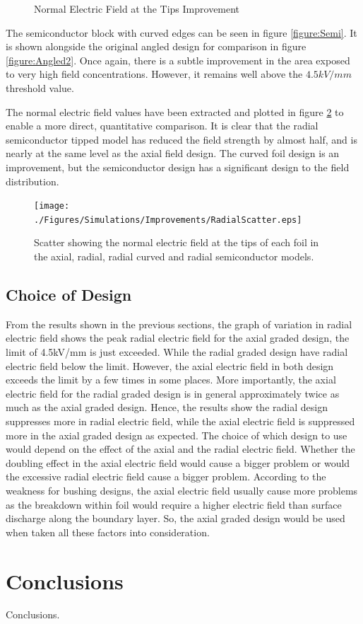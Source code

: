 \begin{figure}[!h]
\centering
{}
\caption{Normal Electric Field at the Tips Improvement}
\label{figure:semicompare}
\end{figure}

The semiconductor block with curved edges can be seen in figure \ref{figure:Semi}.
It is shown alongside the original angled design for comparison in figure \ref{figure:Angled2}.
Once again, there is a subtle improvement in the area exposed to very high field concentrations.
However, it remains well above the $4.5kV/mm$ threshold value.

The normal electric field values have been extracted and plotted in figure \ref{figure:scattercomp} to enable a more direct, quantitative comparison.
It is clear that the radial semiconductor tipped model has reduced the field strength by almost half, and is nearly at the same level as the axial field design.
The curved foil design is an improvement, but the semiconductor design has a significant design to the field distribution.

\begin{figure}[!h]
\centering
\texttt{[image: ./Figures/Simulations/Improvements/RadialScatter.eps]}
\caption{Scatter showing the normal electric field at the tips of each foil in the axial, radial, radial curved and radial semiconductor models.}
\label{figure:scattercomp}
\end{figure}


\subsection{Choice of Design}
From the results shown in the previous sections, the graph of variation in radial electric field shows the peak radial electric field for the axial graded design, the limit of 4.5kV/mm is just exceeded. While the radial graded design have radial electric field below the limit. However, the axial electric field in both design exceeds the limit by a few times in some places. More importantly, the axial electric field for the radial graded design is in general approximately twice as much as the axial graded design. Hence, the results show the radial design suppresses more in radial electric field, while the axial electric field is suppressed more in the axial graded design as expected. The choice of which design to use would depend on the effect of the axial and the radial electric field. Whether the doubling effect in the axial electric field would cause a bigger problem or would the excessive radial electric field cause a bigger problem. According to the weakness for bushing designs, the axial electric field usually cause more problems as the breakdown within foil would require a higher electric field than surface discharge along the boundary layer. So, the axial graded design would be used when taken all these factors into consideration.

\section{Conclusions}
Conclusions.

